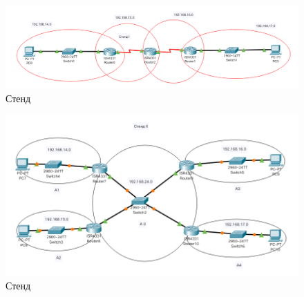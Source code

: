 \begin{figure}[H]
    \centering
    \includegraphics[width=0.8\linewidth]{images/scr01.png}
    \caption{Стенд }%
\end{figure}
\begin{figure}[H]
    \centering
    \includegraphics[width=0.8\linewidth]{images/scr02.png}
    \caption{Стенд }%
\end{figure}

